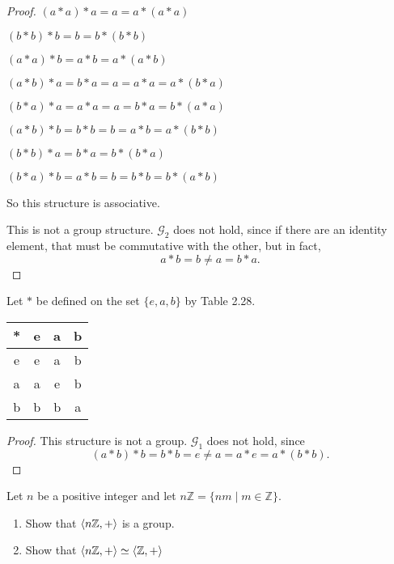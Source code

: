 \begin{proof}
    $(a * a) * a = a = a * (a * a)$

    $(b * b) * b = b = b * (b * b)$

    $(a * a) * b = a * b = a * (a * b)$

    $(a * b) * a = b * a = a = a * a = a * (b * a)$

    $(b * a) * a = a * a = a = b * a = b * (a * a)$

    $(a * b) * b = b * b = b = a * b = a * (b * b)$

    $(b * b) * a = b * a = b * (b * a)$

    $(b * a) * b = a * b = b = b * b = b * (a * b)$

    So this structure is associative.

    This is not a group structure. $\mathcal{G}_{2}$ does not hold, since if there are an identity element, that must be commutative with the other, but in fact,
    \[
        a * b = b \ne a = b * a.
    \]
\end{proof}

\begin{exercise}
    Let $*$ be defined on the set $\{ e, a, b \}$ by Table 2.28.
    \begin{tabular}{c|ccc}
        * & e & a & b \\
        \hline
        e & e & a & b \\
        a & a & e & b \\
        b & b & b & a
    \end{tabular}
\end{exercise}

\begin{proof}
    This structure is not a group. $\mathcal{G}_{1}$ does not hold, since
    \[
        (a * b) * b = b * b = e \ne a = a * e = a * (b * b).
    \]
\end{proof}

\begin{exercise}
    Let $n$ be a positive integer and let $n\mathbb{Z} = \{ nm \mid m\in\mathbb{Z} \}$.
    \begin{enumerate}[label={\textbf{\alph*.}}]
        \item Show that $\left\langle{n\mathbb{Z}, +}\right\rangle$ is a group.
        \item Show that $\left\langle{n\mathbb{Z}, +}\right\rangle \simeq \left\langle{\mathbb{Z}, +}\right\rangle$
    \end{enumerate}
\end{exercise}

